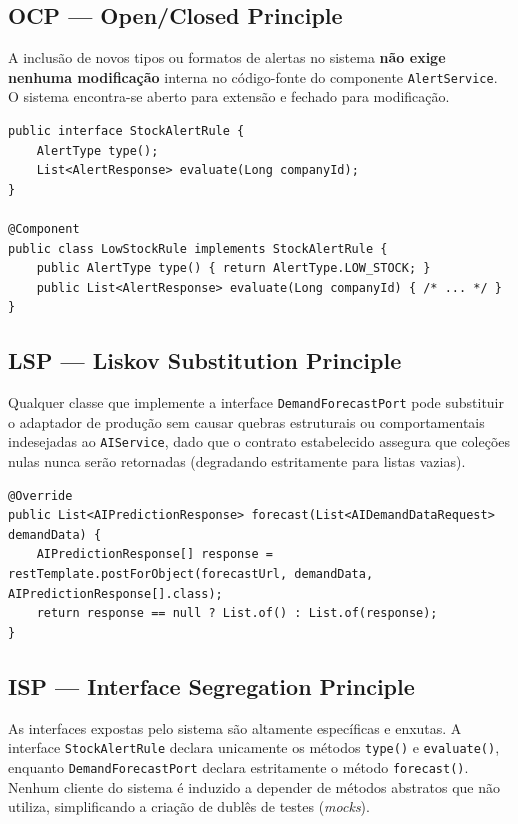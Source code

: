 \documentclass[12pt,a4paper]{article}
\begin{document}
\subsection{OCP — Open/Closed Principle}
A inclusão de novos tipos ou formatos de alertas no sistema \textbf{não exige nenhuma modificação} interna no código-fonte do componente \texttt{AlertService}. O sistema encontra-se aberto para extensão e fechado para modificação.

\begin{lstlisting}
public interface StockAlertRule {
    AlertType type();
    List<AlertResponse> evaluate(Long companyId);
}

@Component
public class LowStockRule implements StockAlertRule {
    public AlertType type() { return AlertType.LOW_STOCK; }
    public List<AlertResponse> evaluate(Long companyId) { /* ... */ }
}
\end{lstlisting}

\subsection{LSP — Liskov Substitution Principle}
Qualquer classe que implemente a interface \texttt{DemandForecastPort} pode substituir o adaptador de produção sem causar quebras estruturais ou comportamentais indesejadas ao \texttt{AIService}, dado que o contrato estabelecido assegura que coleções nulas nunca serão retornadas (degradando estritamente para listas vazias).

\begin{lstlisting}
@Override
public List<AIPredictionResponse> forecast(List<AIDemandDataRequest> demandData) {
    AIPredictionResponse[] response = restTemplate.postForObject(forecastUrl, demandData, AIPredictionResponse[].class);
    return response == null ? List.of() : List.of(response); 
}
\end{lstlisting}

\subsection{ISP — Interface Segregation Principle}
As interfaces expostas pelo sistema são altamente específicas e enxutas. A interface \texttt{StockAlertRule} declara unicamente os métodos \texttt{type()} e \texttt{evaluate()}, enquanto \texttt{DemandForecastPort} declara estritamente o método \texttt{forecast()}. Nenhum cliente do sistema é induzido a depender de métodos abstratos que não utiliza, simplificando a criação de dublês de testes (\textit{mocks}).
\end{document}
